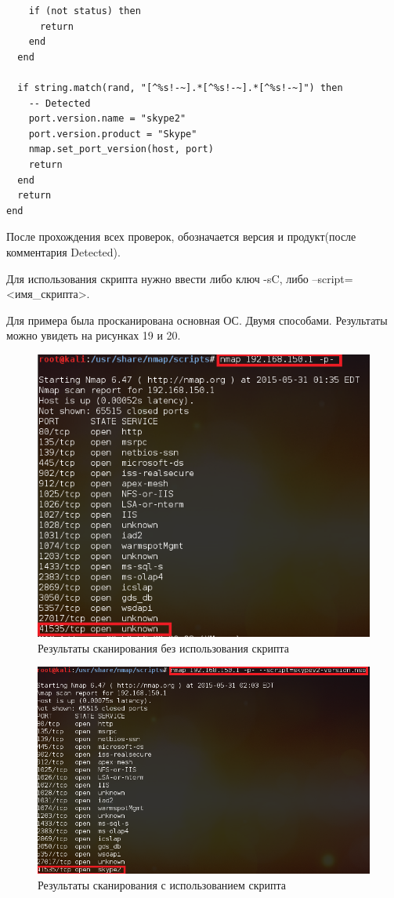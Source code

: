 \documentclass[11pt, a4paper]{article}		%
\begin{document}
\begin{itemize}
\begin{verbatim}
    if (not status) then
      return
    end
  end

  if string.match(rand, "[^%s!-~].*[^%s!-~].*[^%s!-~]") then
    -- Detected
    port.version.name = "skype2"
    port.version.product = "Skype"
    nmap.set_port_version(host, port)
    return
  end
  return
end
\end{verbatim}

После прохождения всех проверок, обозначается версия и продукт(после комментария Detected).

Для использования скрипта нужно ввести либо ключ -sC, либо --script=<имя\_скрипта>.

Для примера была просканирована основная ОС. Двумя способами. Результаты можно увидеть на рисунках 19 и 20.

\begin{figure}[h!]
\centering
\includegraphics[scale=0.8]{res/script_1}
\caption{Результаты сканирования без использования скрипта}
\end{figure}

\begin{figure}[h!]
\centering
\includegraphics[scale=0.8]{res/script_2}
\caption{Результаты сканирования с использованием скрипта}
\end{figure}

\end{itemize}
\end{document}
